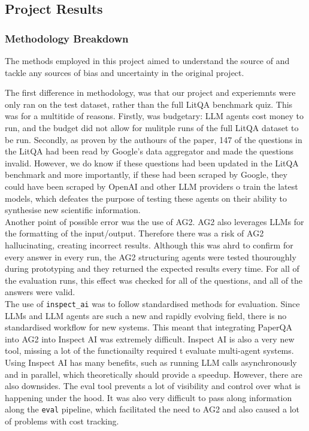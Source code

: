 \subsection{Project Results}

\subsubsection{Methodology Breakdown}
The methods employed in this project aimed to understand the source of and tackle any sources of bias and uncertainty in the original project. 

The first difference in methodology, was that our project and experiemnts were only ran on the test dataset, rather than the full LitQA benchmark quiz. This was for a multitide of reasons. Firstly, was budgetary: LLM agents cost money to run, and the budget did not allow for mulitple runs of the full LitQA dataset to be run. Secondly, as proven by the authours of the paper, 147 of the questions in the LitQA had been read by Google's data aggregator and made the questions invalid. However, we do know if these questions had been updated in the LitQA benchmark and more importantly, if these had been scraped by Google, they could have been scraped by OpenAI and other LLM providers o train the latest models, which defeates the purpose of testing these agents on their ability to synthesise new scientific information. \\

Another point of possible error was the use of AG2. AG2 also leverages LLMs for the formatting of the input/output. Therefore there was a risk of AG2 hallucinating, creating incorrect results. Although this was ahrd to confirm for every answer in every run, the AG2 structuring agents were tested thouroughly during prototyping and they returned the expected results every time. For all of the evaluation runs, this effect was checked for all of the questions, and all of the answers were valid. \\

The use of \texttt{inspect\_ai} was to follow standardised methods for evaluation. Since LLMs and LLM agents are such a new and rapidly evolving field, there is no standardised workflow for new systems. This meant that integrating PaperQA into AG2 into Inspect AI was extremely difficult. Inspect AI is also a very new tool, missing a lot of the functionailty required t evaluate multi-agent systems. Using Inspect AI has many benefits, such as running LLM calls asynchronously and in parallel, which theoretically should provide a speedup. However, there are also downsides. The eval tool prevents a lot of visibility and control over what is happening under the hood. It was also very difficult to pass along information along the \texttt{eval} pipeline, which facilitated the need to AG2 and also caused a lot of problems with cost tracking. 

